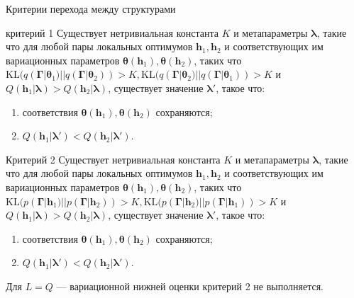 \documentclass[10pt,pdf,utf8,russian,aspectratio=169]{beamer}
\begin{document}
\begin{frame}{Критерии перехода между структурами}
\small
\begin{block}{критерий 1}
Существует нетривиальная константа $K$ и метапараметры $\boldsymbol{\lambda}$, такие что для любой пары локальных оптимумов $\mathbf{h}_1, \mathbf{h}_2$ и соответствующих им вариационных параметров $\boldsymbol{\theta}(\mathbf{h}_1), \boldsymbol{\theta}(\mathbf{h}_2)$, таких что $\text{KL}(q(\boldsymbol{\Gamma}|\boldsymbol{\theta}_1)||q(\boldsymbol{\Gamma}|\boldsymbol{\theta}_2))>K, \text{KL}(q(\boldsymbol{\Gamma}|\boldsymbol{\theta}_2)||q(\boldsymbol{\Gamma}|\boldsymbol{\theta}_1))>K$ и $Q(\mathbf{h}_1|\boldsymbol{\lambda}) > Q(\mathbf{h}_2|\boldsymbol{\lambda})$,  существует значение $\boldsymbol{\lambda}'$, такое что:
\begin{enumerate}
\item соответствия $\boldsymbol{\theta}(\mathbf{h}_1), \boldsymbol{\theta}(\mathbf{h}_2)$ сохраняются;
\item $Q(\mathbf{h}_1|\boldsymbol{\lambda}') < Q(\mathbf{h}_2|\boldsymbol{\lambda}').$
\end{enumerate}
\end{block}

\begin{block}{Критерий 2}
Существует нетривиальная константа $K$ и метапараметры $\boldsymbol{\lambda}$, такие что для любой пары локальных оптимумов $\mathbf{h}_1, \mathbf{h}_2$ и соответствующих им вариационных параметров $\boldsymbol{\theta}(\mathbf{h}_1), \boldsymbol{\theta}(\mathbf{h}_2)$, таких что $\text{KL}(p(\boldsymbol{\Gamma}|\mathbf{h}_1)||p(\boldsymbol{\Gamma}|\mathbf{h}_2))>K, \text{KL}(p(\boldsymbol{\Gamma}|\mathbf{h}_2)||p(\boldsymbol{\Gamma}|\mathbf{h}_1))>K$ и $Q(\mathbf{h}_1|\boldsymbol{\lambda}) > Q(\mathbf{h}_2|\boldsymbol{\lambda})$,  существует значение $\boldsymbol{\lambda}'$, такое что:
\begin{enumerate}
\item соответствия $\boldsymbol{\theta}(\mathbf{h}_1), \boldsymbol{\theta}(\mathbf{h}_2)$ сохраняются;
\item $Q(\mathbf{h}_1|\boldsymbol{\lambda}') < Q(\mathbf{h}_2|\boldsymbol{\lambda}').$
\end{enumerate}
\end{block}

Для $L = Q $ --- вариационной нижней оценки критерий 2 не выполняется.
\end{frame}
\end{document}
